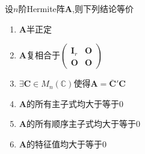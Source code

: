 \begin{formal}
    \begin{theorem}[半正定的等价结论]\label{thm:半正定的等价结论2}
        设$n$阶\textup{Hermite}阵$\bm{A}$,则下列结论等价\begin{enumerate}[label={\textup{(\arabic*)}}]
            \item $\bm{A}$半正定
            \item $\bm{A}$复相合于$\begin{pmatrix}
                \bm{I}_r&\bm{O}\\
                \bm{O}&\bm{O}
            \end{pmatrix}$
            \item $\exists \bm{C}\in M_n\left(\mathbb{C}\right)$使得$\bm{A}=\overline{\bm{C}}'\bm{C}$
            \item $\bm{A}$的所有主子式均大于等于$0$
            \item $\bm{A}$的所有顺序主子式均大于等于$0$
            \item $\bm{A}$的特征值均大于等于$0$
        \end{enumerate}
    \end{theorem}
\end{formal}